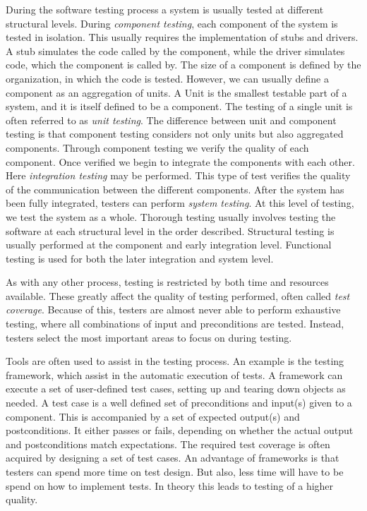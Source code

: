 During the software testing process a system is usually tested at different structural levels. During \emph{component testing}, each component of the system is tested in isolation. This usually requires the implementation of stubs and drivers. A stub simulates the code called by the component, while the driver simulates code, which the component is called by. The size of a component is defined by the organization, in which the code is tested. However, we can usually define a component as an aggregation of units. A Unit is the smallest testable part of a system, and it is itself defined to be a component. The testing of a single unit is often referred to as \emph{unit testing}. The difference between unit and component testing is that component testing considers not only units but also aggregated components. Through component testing we verify the quality of each component. Once verified we begin to integrate the components with each other. Here \emph{integration testing} may be performed. This type of test verifies the quality of the communication between the different components. After the system has been fully integrated, testers can perform \emph{system testing}. At this level of testing, we test the system as a whole. Thorough testing usually involves testing the software at each structural level in the order described. Structural testing is usually performed at the component and early integration level. Functional testing is used for both the later integration and system level.

As with any other process, testing is restricted by both time and resources available. These greatly affect the quality of testing performed, often called \emph{test coverage}. Because of this, testers are almost never able to perform exhaustive testing, where all combinations of input and preconditions are tested. Instead, testers select the most important areas to focus on during testing.

Tools are often used to assist in the testing process. An example is the testing framework, which assist in the automatic execution of tests. A framework can execute a set of user-defined test cases, setting up and tearing down objects as needed. A test case is a well defined set of preconditions and input(s) given to a component. This is accompanied by a set of expected output(s) and postconditions. It either passes or fails, depending on whether the actual output and postconditions match expectations. The required test coverage is often acquired by designing a set of test cases. An advantage of frameworks is that testers can spend more time on test design. But also, less time will have to be spend on how to implement tests. In theory this leads to testing of a higher quality.

